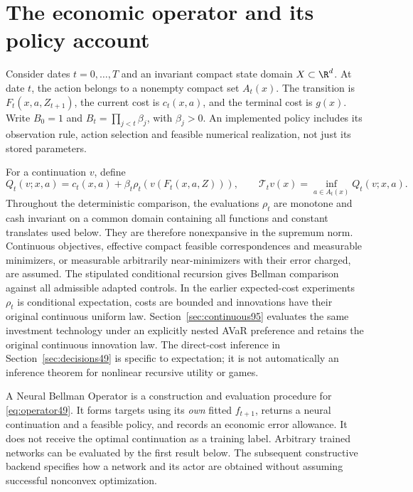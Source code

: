 \section{The economic operator and its policy account}\label{sec:core49}
Consider dates $t=0,\ldots,T$ and an invariant compact state domain $X\subset\R^d$. At date $t$, the action belongs to a nonempty compact set $A_t(x)$. The transition is $F_t(x,a,Z_{t+1})$, the current cost is $c_t(x,a)$, and the terminal cost is $g(x)$. Write $B_0=1$ and $B_t=\prod_{j<t}\beta_j$, with $\beta_j>0$. An implemented policy includes its observation rule, action selection and feasible numerical realization, not just its stored parameters.

For a continuation $v$, define
\begin{equation}\label{eq:operator49}
 Q_t(v;x,a)=c_t(x,a)+\beta_t\rho_t(v(F_t(x,a,Z))),\qquad
 \mathcal T_tv(x)=\inf_{a\in A_t(x)}Q_t(v;x,a).
\end{equation}
Throughout the deterministic comparison, the evaluations $\rho_t$ are monotone and cash invariant on a common domain containing all functions and constant translates used below. They are therefore nonexpansive in the supremum norm. Continuous objectives, effective compact feasible correspondences and measurable minimizers, or measurable arbitrarily near-minimizers with their error charged, are assumed. The stipulated conditional recursion gives Bellman comparison against all admissible adapted controls. In the earlier expected-cost experiments $\rho_t$ is conditional expectation, costs are bounded and innovations have their original continuous uniform law. Section~\ref{sec:continuous95} evaluates the same investment technology under an explicitly nested AVaR preference and retains the original continuous innovation law. The direct-cost inference in Section~\ref{sec:decisions49} is specific to expectation; it is not automatically an inference theorem for nonlinear recursive utility or games.

A Neural Bellman Operator is a construction and evaluation procedure for \eqref{eq:operator49}. It forms targets using its \emph{own} fitted $f_{t+1}$, returns a neural continuation and a feasible policy, and records an economic error allowance. It does not receive the optimal continuation as a training label. Arbitrary trained networks can be evaluated by the first result below. The subsequent constructive backend specifies how a network and its actor are obtained without assuming successful nonconvex optimization.

